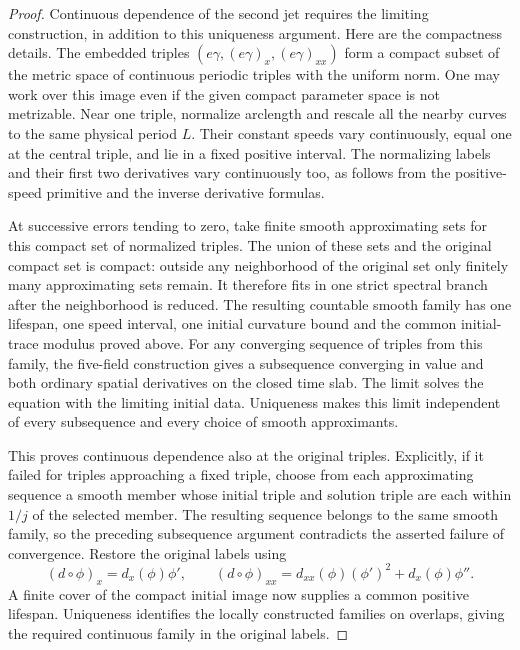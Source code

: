 \begin{proof}
Continuous dependence of the second jet requires the limiting
construction, in addition to this uniqueness argument.  Here are
the compactness details.  The embedded triples
$(e\gamma,(e\gamma)_x,(e\gamma)_{xx})$ form a compact subset of
the metric space of continuous periodic triples with the uniform norm.
One may work over this image even if the given compact parameter
space is not metrizable.  Near one triple, normalize arclength and
rescale all the nearby curves to the same physical period $L$.
Their constant speeds vary continuously, equal one at the central
triple, and lie in a fixed positive interval.  The normalizing
labels and their first two derivatives vary continuously too,
as follows from the positive-speed primitive and the inverse
derivative formulas.

At successive errors tending to zero, take finite smooth
approximating sets for this compact set of normalized triples.
The union of these sets and the original compact set is compact:
outside any neighborhood of the original set only finitely many
approximating sets remain.  It therefore fits in one strict
spectral branch after the neighborhood is reduced.  The resulting
countable smooth family has one lifespan, one speed interval,
one initial curvature bound and the common initial-trace modulus
proved above.  For any converging sequence of triples from this
family, the five-field construction gives a subsequence converging
in value and both ordinary spatial derivatives on the closed
time slab.  The limit solves the equation with the limiting
initial data.  Uniqueness makes this limit independent of every
subsequence and every choice of smooth approximants.

This proves continuous dependence also at the original triples.
Explicitly, if it failed for triples approaching a fixed triple,
choose from each approximating sequence a smooth member whose
initial triple and solution triple are each within $1/j$ of the
selected member.  The resulting sequence belongs to the same
smooth family, so the preceding subsequence argument contradicts
the asserted failure of convergence.  Restore the original
labels using
\[
 (d\circ\phi)_x=d_x(\phi)\phi',\qquad
 (d\circ\phi)_{xx}=d_{xx}(\phi)(\phi')^2+d_x(\phi)\phi''.
\]
A finite cover of the compact initial image now supplies a common
positive lifespan.  Uniqueness identifies the locally constructed
families on overlaps, giving the required continuous family in
the original labels.


\end{proof}
